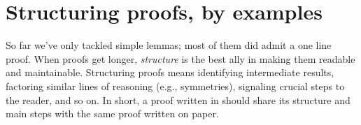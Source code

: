 % 
% 
% 
% 
% 
% 
% 
\section{Structuring proofs, by examples}

So far we've only tackled simple lemmas; most of them did admit a one line
proof.  When proofs get longer, \emph{structure} is the best ally in making
them readable and maintainable.  Structuring proofs means identifying
intermediate results, factoring similar lines of reasoning (e.g., symmetries),
signaling crucial steps to the reader, and so on.  In short, a
proof written in \Coq{} should share its structure and main steps
with the same proof written on paper.

